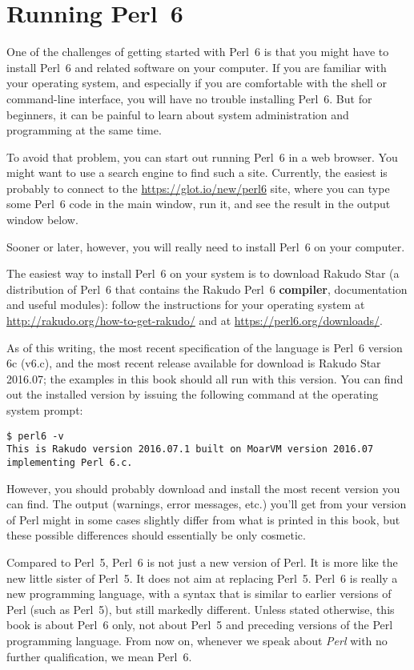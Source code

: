 \section{Running Perl~6}
\label{running_perl_6}

One of the challenges of getting started with Perl~6 is that you
might have to install Perl~6 and related software on your computer. 
If you are familiar with your operating system, and especially
if you are comfortable with the shell or command-line interface, 
you will have no trouble installing Perl~6.  But for beginners, 
it can be painful to learn about system administration and 
programming at the same time.

To avoid that problem, you can start out running Perl~6 
in a web browser. You might want to use a search engine 
to find such a site. Currently, the easiest is probably 
to connect to the \url{https://glot.io/new/perl6} site, 
where you can type some Perl~6 code in the main window, run 
it, and see the result in the output window below.

Sooner or later, however, you will really need to install 
Perl~6 on your computer.

The easiest way to install Perl~6 on your system is to 
download Rakudo Star (a distribution of Perl~6 that contains 
the Rakudo Perl~6 {\bf compiler}, documentation and useful modules): 
follow the instructions for your operating system at 
\url{http://rakudo.org/how-to-get-rakudo/} and at 
\url{https://perl6.org/downloads/}. 

As of this writing, the most recent specification of 
the language is Perl~6 version 6c (v6.c), and the most 
recent release available for download is Rakudo Star 2016.07; 
the examples in this book should 
all run with this version. You can find out the installed 
version by issuing the following command at the operating 
system prompt:
\begin{verbatim}
$ perl6 -v
This is Rakudo version 2016.07.1 built on MoarVM version 2016.07
implementing Perl 6.c.
\end{verbatim}

However, you should probably download and install the most recent 
version you can find. The output (warnings, error messages, 
etc.) you'll get from your version of Perl might in some 
cases slightly differ from what is printed in this book, 
but these possible differences should essentially be 
only cosmetic. 

Compared to Perl~5, Perl~6 is not just a new version of Perl. 
It is more like the new little sister of Perl~5. It does not 
aim at replacing Perl~5. Perl~6 is really a new programming language, 
with a syntax that is similar to earlier versions of 
Perl (such as Perl~5), but still markedly different. Unless 
stated otherwise, this book is about Perl~6 only, not about Perl~5 
and preceding versions of the Perl programming language. From now on, 
whenever we speak about \emph{Perl} with no further qualification, 
we mean Perl~6.

